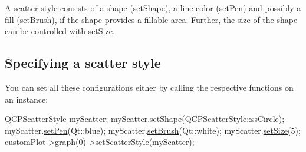 A scatter style consists of a shape (\hyperlink{class_q_c_p_scatter_style_a7c641c4d4c6d29cb705d3887cfce91c1}{set\+Shape}), a line color (\hyperlink{class_q_c_p_scatter_style_a761f1f229cc0ca4703e1e2b89f6dd1ba}{set\+Pen}) and possibly a fill (\hyperlink{class_q_c_p_scatter_style_a74d692aaeb8d4b36d6f7d510e44264b1}{set\+Brush}), if the shape provides a fillable area. Further, the size of the shape can be controlled with \hyperlink{class_q_c_p_scatter_style_aaefdd031052892c4136129db68596e0f}{set\+Size}.\hypertarget{class_q_c_p_scatter_style_QCPScatterStyle-defining}{}\subsection{Specifying a scatter style}\label{class_q_c_p_scatter_style_QCPScatterStyle-defining}
You can set all these configurations either by calling the respective functions on an instance\+: 
\begin{DoxyCode}
\hyperlink{class_q_c_p_scatter_style}{QCPScatterStyle} myScatter;
myScatter.\hyperlink{class_q_c_p_scatter_style_a7c641c4d4c6d29cb705d3887cfce91c1}{setShape}(\hyperlink{class_q_c_p_scatter_style_adb31525af6b680e6f1b7472e43859349a7c92a110880d0ef2170dff3a5b4f7779}{QCPScatterStyle::ssCircle});
myScatter.\hyperlink{class_q_c_p_scatter_style_a761f1f229cc0ca4703e1e2b89f6dd1ba}{setPen}(Qt::blue);
myScatter.\hyperlink{class_q_c_p_scatter_style_a74d692aaeb8d4b36d6f7d510e44264b1}{setBrush}(Qt::white);
myScatter.\hyperlink{class_q_c_p_scatter_style_aaefdd031052892c4136129db68596e0f}{setSize}(5);
customPlot->graph(0)->setScatterStyle(myScatter);
\end{DoxyCode}


